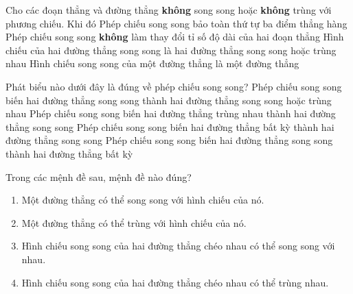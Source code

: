 \begin{ex}%
	Cho các đoạn thẳng và đường thẳng \textbf{không} song song hoặc \textbf{không} trùng với phương chiếu. Khi  đó
	\choiceTF 
		{\True Phép chiếu song song bảo toàn thứ tự ba  điểm thẳng hàng}
		{Phép chiếu song song \textbf{không} làm thay đổi tỉ số độ dài của hai đoạn thẳng} 
		{\True Hình chiếu  của hai đường thẳng song song là hai đường thẳng song song hoặc trùng nhau}
		{\True Hình chiếu song song của một đường thẳng là một đường  thẳng}
\end{ex}

\begin{ex}%
	Phát  biểu nào dưới đây là đúng về phép chiếu song song?
	 \choice
		{\True Phép chiếu  song song biến hai đường thẳng song song thành hai đường thẳng song song hoặc trùng nhau}
		{Phép chiếu song  song biến hai đường thẳng trùng nhau thành hai đường thẳng song song}
		{Phép chiếu song song biến hai đường thẳng bất kỳ thành hai  đường thẳng song song}
		{Phép chiếu  song song biến hai đường thẳng song song thành hai đường thẳng bất kỳ}
\end{ex}

\begin{bt}%
	Trong các mệnh đề sau, mệnh đề nào đúng?
	\begin{enumerate}
		\item Một đường thẳng có thể song song với hình chiếu của nó.
		\item Một đường thẳng có thể trùng với hình chiếu của nó.
		\item Hình chiếu song song của hai đường thẳng chéo nhau có thể song song với nhau.
		\item Hình chiếu song song của hai đường thẳng chéo nhau có thể trùng nhau.
	\end{enumerate}
\end{bt}
